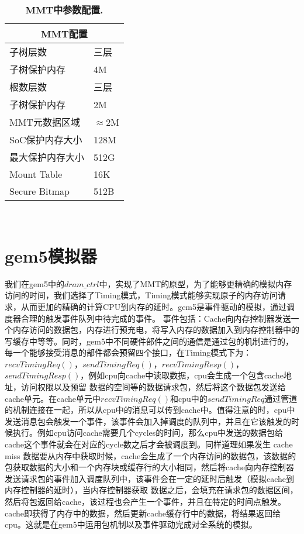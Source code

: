 \begin{table}[htp]
    \centering
    \footnotesize
    \caption{\textbf{MMT中参数配置.}}
    \label{t:gem5-config}
    \begin{tabular}{p{3.25cm}<{\centering} p{3.25cm}<{\centering} }
    \toprule
    \multicolumn{2}{c}{\textbf{MMT配置}} \\ \hline
    子树层数              & 三层   \\
    子树保护内存              & 4M   \\
    根数层数              & 三层   \\
    子树保护内存              & 2M   \\
    MMT元数据区域              & $\approx$2M   \\
    SoC保护内存大小              & 128M   \\
    最大保护内存大小              &  512G   \\
    Mount Table              & 16K   \\
    Secure Bitmap   & 512B \\
    \bottomrule
    \end{tabular} \\[-5pt]
\end{table}

\section{gem5模拟器}
我们在gem5中的$dram\_ctrl$中，实现了MMT的原型，为了能够更精确的模拟内存访问的时间，我们选择了Timing模式，Timing模式能够实现原子的内存访问请求，从而更加的精确的计算CPU到内存的延时。gem5是事件驱动的模拟，通过调度器合理的触发事件队列中待完成的事件。
事件包括：Cache向内存控制器发送一个内存访问的数据包，内存进行预充电，将写入内存的数据加入到内存控制器中的写缓存中等等。同时，gem5中不同硬件部件之间的通信是通过包的机制进行的，每一个能够接受消息的部件都会预留四个接口，在Timing模式下为：$recvTimingReq()$，$sendTimingReq()$，$recvTimingResp()$，$sendTimingResp()$，例如cpu向cache中读取数据，cpu会生成一个包含cache地址，访问权限以及预留
数据的空间等的数据请求包，然后将这个数据包发送给cache单元。在cache单元中$recvTimingReq()$和cpu中的$sendTimingReq$通过管道的机制连接在一起，所以从cpu中的消息可以传到cache中。值得注意的时，cpu中发送消息包会触发一个事件，该事件会加入掉调度的队列中，并且在它该触发的时候执行。例如cpu访问cache需要几个cycles的时间，那么cpu中发送的数据包给cache这个事件就会在对应的cycle数之后才会被调度到。同样道理如果发生
cache miss 数据要从内存中获取时候，cache会生成了一个内存访问的数据包，该数据的包获取数据的大小和一个内存块或缓存行的大小相同，然后将cache向内存控制器发送请求包的事件加入调度队列中，该事件会在一定的延时后触发（模拟cache到内存控制器的延时），当内存控制器获取
数据之后，会填充在请求包的数据区间，然后将包返回给cache，该过程也会产生一个事件，并且在特定的时间点触发。cache即获得了内存中的数据，然后更新cache缓存行中的数据，将结果返回给cpu。这就是在gem5中运用包机制以及事件驱动完成对全系统的模拟。

